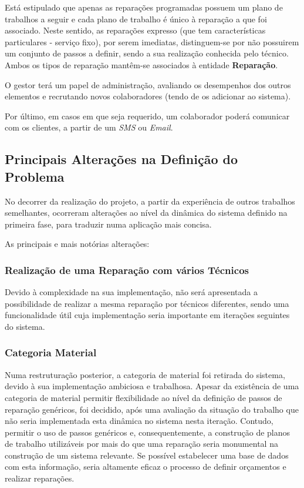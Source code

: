 \documentclass[a4paper,12pt]{scrreprt}
\begin{document}
Está estipulado que apenas as reparações programadas possuem um plano de trabalhos a seguir e cada plano de trabalho é único à 
reparação a que foi associado.
Neste sentido, as reparações expresso (que tem características particulares - serviço fixo), por serem imediatas, distinguem-se 
por não possuirem um conjunto de passos a definir, sendo a sua realização conhecida pelo técnico.
Ambos os tipos de reparação mantêm-se associados à entidade \textbf{Reparação}.

O gestor terá um papel de administração, avaliando os desempenhos dos outros elementos e
recrutando novos colaboradores (tendo de os adicionar ao sistema).

Por último, em casos em que seja requerido, um colaborador poderá comunicar com os clientes, a partir de um \textit{SMS} ou \textit{Email}.

\subsection{Principais Alterações na Definição do Problema}\label{princ_alter_prob}

No decorrer da realização do projeto, a partir da experiência de outros trabalhos semelhantes, ocorreram alterações ao
nível da dinâmica do sistema definido na primeira fase, para traduzir numa aplicação mais concisa.

As principais e mais notórias alterações:

\subsubsection{Realização de uma Reparação com vários Técnicos} 
Devido à complexidade na sua implementação, não será apresentada a possibilidade de realizar a mesma reparação por técnicos diferentes, 
sendo uma funcionalidade útil cuja implementação seria importante em iterações seguintes do sistema.

\subsubsection{Categoria Material}

Numa restruturação posterior, a categoria de material foi retirada do sistema, devido à sua implementação ambiciosa e trabalhosa.
Apesar da existência de uma categoria de material permitir flexibilidade ao nível da definição de passos de reparação genéricos, foi decidido, após uma 
avaliação da situação do trabalho que não seria implementada esta dinâmica no sistema nesta iteração. Contudo, permitir o uso de passos genéricos e,
consequentemente, a construção de planos de trabalho utilizáveis por mais do que uma reparação seria monumental na construção de um sistema relevante. 
Se possível estabelecer uma base de dados com esta informação, seria altamente eficaz o processo de definir orçamentos e realizar reparações.
\end{document}
